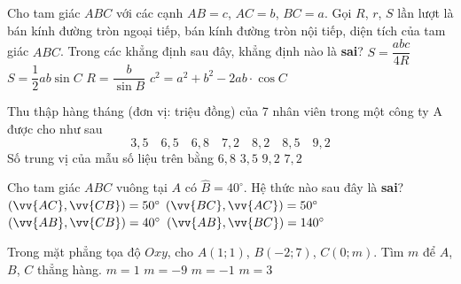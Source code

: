 \begin{ex}%
	Cho tam giác $ABC$ với các cạnh $AB=c$, $AC=b$, $BC=a$. Gọi $R$, $r$, $S$ lần lượt là bán kính đường tròn ngoại tiếp, bán kính đường tròn nội tiếp, diện tích của tam giác $ABC$. Trong các khẳng định sau đây, khẳng định nào là \textbf{sai}?
	\choice
	{$S=\dfrac{abc}{4R}$}
	{$S=\dfrac{1}{2}ab\sin C$}
	{\True $R=\dfrac{b}{\sin B}$}
	{$c^2=a^2+b^2-2ab\cdot\cos C$}
\end{ex}
\begin{ex}%
	Thu thập hàng tháng (đơn vị: triệu đồng) của 7 nhân viên trong một công ty A được cho như sau $$3{,}5\quad6{,}5\quad6{,}8\quad7{,}2\quad8{,}2\quad8{,}5\quad9{,}2$$ Số trung vị của mẫu số liệu trên bằng
	\choice
	{$6{,}8$}
	{$3{,}5$}
	{$9{,}2$}
	{\True $7{,}2$}
\end{ex}
\begin{ex}%
	Cho tam giác $ABC$ vuông tại $A$ có $\widehat{B}=40^\circ$. Hệ thức nào sau đây là \textbf{sai}?
	\choice
	{\True $(\vv{AC},\vv{CB})=50^\circ$}
	{$(\vv{BC},\vv{AC})=50^\circ$}
	{$(\vv{AB},\vv{CB})=40^\circ$}
	{$(\vv{AB},\vv{BC})=140^\circ$}
\end{ex}
\begin{ex}%
	Trong mặt phẳng tọa độ $Oxy$, cho $A(1;1)$, $B(-2;7)$, $C(0;m)$. Tìm $m$ để $A$, $B$, $C$ thẳng hàng.
	\choice
	{$m=1$}
	{$m=-9$}
	{$m=-1$}
	{\True $m=3$}
\end{ex}
